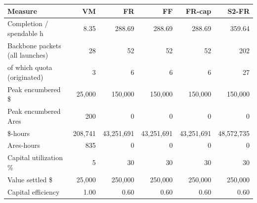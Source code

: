 \par\noindent
\begin{tabular}{lrrrrr}
\toprule
Measure & VM & FR & FF & FR-cap & S2-FR\\
\midrule
Completion / spendable h & 8.35 & 288.69 & 288.69 & 288.69 & 359.64\\
Backbone packets (all launches) & 28 & 52 & 52 & 52 & 202\\
of which quota (originated) & 3 & 6 & 6 & 6 & 27\\
Peak encumbered \$ & 25{,}000 & 150{,}000 & 150{,}000 & 150{,}000 & 150{,}000\\
Peak encumbered Ares & 200 & 0 & 0 & 0 & 0\\
\$-hours & 208{,}741 & 43{,}251{,}691 & 43{,}251{,}691 & 43{,}251{,}691 & 48{,}572{,}735\\
Ares-hours & 835 & 0 & 0 & 0 & 0\\
Capital utilization \% & 5 & 30 & 30 & 30 & 30\\
Value settled \$ & 25{,}000 & 250{,}000 & 250{,}000 & 250{,}000 & 250{,}000\\
Capital efficiency & 1.00 & 0.60 & 0.60 & 0.60 & 0.60\\
\bottomrule
\end{tabular}\par
